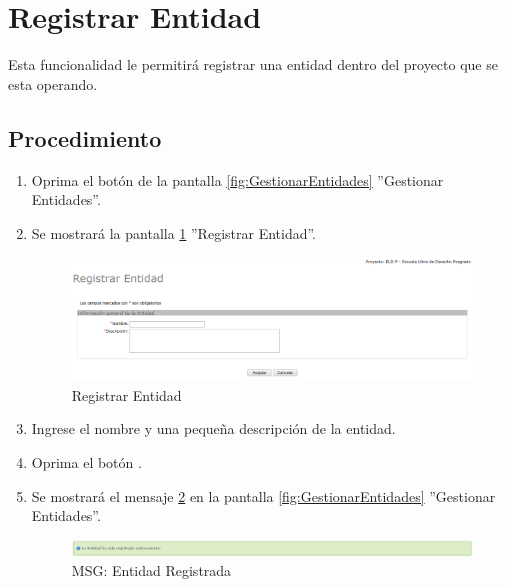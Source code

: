
\hypertarget{cv:registrarEntidad}{\section{Registrar Entidad}} \label{sec:registrarEntidad}

	Esta funcionalidad le permitirá registrar una entidad dentro del proyecto que se esta operando. 

		\subsection{Procedimiento}

			\begin{enumerate}
	
			\item Oprima el botón \IURegistrar{} de la pantalla \ref{fig:GestionarEntidades} ''Gestionar Entidades''.
			
			\item Se mostrará la pantalla \ref{fig:registrarEntidad} ''Registrar Entidad''.

			\begin{figure}[H]
				\begin{center}
					\includegraphics[scale=0.5]{roles/lider/entidades/pantallas/IU12-1registrarEntidad}
					\caption{Registrar Entidad}
					\label{fig:registrarEntidad}
				\end{center}
			\end{figure}
		
			\item Ingrese el nombre y una pequeña descripción de la entidad.
			
			\item Oprima el botón \IUAceptar.
			
			\item Se mostrará el mensaje \ref{fig:entidadRegistrada} en la pantalla \ref{fig:GestionarEntidades} ''Gestionar Entidades''.
			
			\begin{figure}[htbp!]
				\begin{center}
					\includegraphics[scale=0.5]{roles/lider/entidades/pantallas/IU12-1MSG1}
					\caption{MSG: Entidad Registrada}
					\label{fig:entidadRegistrada}
				\end{center}
			\end{figure}
			\end{enumerate}